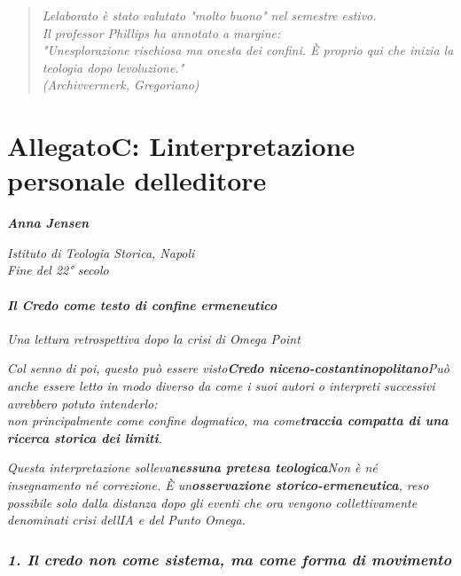 \documentclass[
]{article}
\begin{document}
\begin{quote}
\emph{L\textquotesingle elaborato è stato valutato "molto buono" nel semestre estivo.\\
Il professor Phillips ha annotato a margine:\\
"Un\textquotesingle esplorazione rischiosa ma onesta dei confini. È proprio qui che inizia la teologia dopo l\textquotesingle evoluzione."\\
(Archivvermerk, Gregoriano)}
\end{quote}

\section{\texorpdfstring{AllegatoC: \textbf{L\textquotesingle interpretazione personale dell\textquotesingle editore}}{AllegatoC: L\textquotesingle interpretazione personale dell\textquotesingle editore}}\label{allegatoc-linterpretazione-personale-delleditore}

\emph{\textbf{Anna Jensen}}

\emph{Istituto di Teologia Storica, Napoli\\
Fine del 22° secolo}

\paragraph{\texorpdfstring{\emph{\textbf{Il Credo come testo di confine ermeneutico}}}{Il Credo come testo di confine ermeneutico}}\label{il-credo-come-testo-di-confine-ermeneutico}

\emph{Una lettura retrospettiva dopo la crisi di Omega Point}

\emph{Col senno di poi, questo può essere visto\textbf{Credo niceno-costantinopolitano}Può anche essere letto in modo diverso da come i suoi autori o interpreti successivi avrebbero potuto intenderlo:\\
non principalmente come confine dogmatico, ma come\textbf{traccia compatta di una ricerca storica dei limiti}.}

\emph{Questa interpretazione solleva\textbf{nessuna pretesa teologica}Non è né insegnamento né correzione. È un\textbf{osservazione storico-ermeneutica}, reso possibile solo dalla distanza dopo gli eventi che ora vengono collettivamente denominati crisi dell\textquotesingle IA e del Punto Omega.}

\subsubsection{\texorpdfstring{\emph{\textbf{1. Il credo non come sistema, ma come forma di movimento}}}{1. Il credo non come sistema, ma come forma di movimento}}\label{il-credo-non-come-sistema-ma-come-forma-di-movimento}
\end{document}
